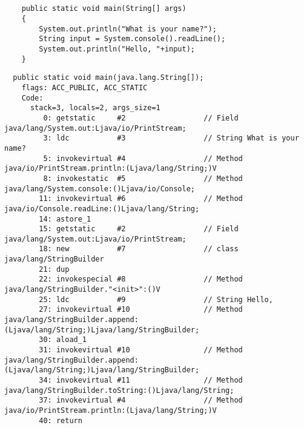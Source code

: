 \subsection{}


\begin{lstlisting}
	public static void main(String[] args)
	{
		System.out.println("What is your name?");
		String input = System.console().readLine();
		System.out.println("Hello, "+input);
	}
\end{lstlisting}

\begin{lstlisting}
  public static void main(java.lang.String[]);
    flags: ACC_PUBLIC, ACC_STATIC
    Code:
      stack=3, locals=2, args_size=1
         0: getstatic     #2                  // Field java/lang/System.out:Ljava/io/PrintStream;
         3: ldc           #3                  // String What is your name?
         5: invokevirtual #4                  // Method java/io/PrintStream.println:(Ljava/lang/String;)V
         8: invokestatic  #5                  // Method java/lang/System.console:()Ljava/io/Console;
        11: invokevirtual #6                  // Method java/io/Console.readLine:()Ljava/lang/String;
        14: astore_1      
        15: getstatic     #2                  // Field java/lang/System.out:Ljava/io/PrintStream;
        18: new           #7                  // class java/lang/StringBuilder
        21: dup           
        22: invokespecial #8                  // Method java/lang/StringBuilder."<init>":()V
        25: ldc           #9                  // String Hello, 
        27: invokevirtual #10                 // Method java/lang/StringBuilder.append:(Ljava/lang/String;)Ljava/lang/StringBuilder;
        30: aload_1       
        31: invokevirtual #10                 // Method java/lang/StringBuilder.append:(Ljava/lang/String;)Ljava/lang/StringBuilder;
        34: invokevirtual #11                 // Method java/lang/StringBuilder.toString:()Ljava/lang/String;
        37: invokevirtual #4                  // Method java/io/PrintStream.println:(Ljava/lang/String;)V
        40: return        
\end{lstlisting}

